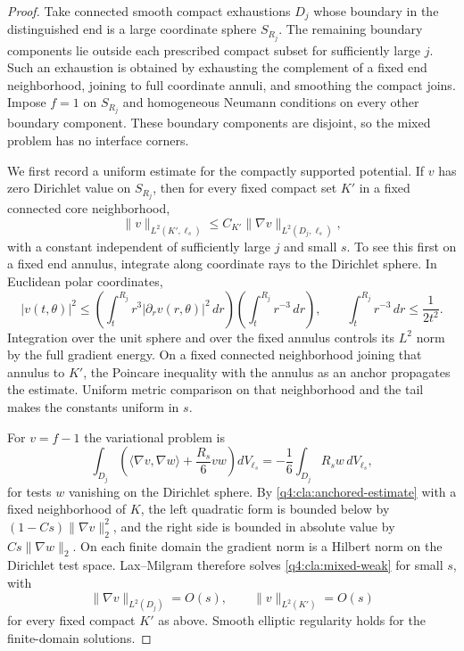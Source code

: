 \begin{proof}
Take connected smooth compact exhaustions $D_j$ whose boundary in
the distinguished end is a large coordinate sphere $S_{R_j}$.
The remaining boundary components lie outside each prescribed
compact subset for sufficiently large $j$.  Such an exhaustion is
obtained by exhausting the complement of a fixed end neighborhood,
joining to full coordinate annuli, and smoothing the compact joins.
Impose $f=1$ on $S_{R_j}$ and homogeneous Neumann conditions on every
other boundary component.  These boundary components are disjoint,
so the mixed problem has no interface corners.

We first record a uniform estimate for the compactly supported
potential.  If $v$ has zero Dirichlet value on $S_{R_j}$, then for
every fixed compact set $K'$ in a fixed connected core neighborhood,
\begin{equation}\label{q4:cla:anchored-estimate}
 \|v\|_{L^2(K',\ell_s)}
       \le C_{K'}\|\nabla v\|_{L^2(D_j,\ell_s)},
\end{equation}
with a constant independent of sufficiently large $j$ and small $s$.
To see this first on a fixed end annulus, integrate along coordinate
rays to the Dirichlet sphere.  In Euclidean polar coordinates,
\[
 |v(t,\theta)|^2
 \le\left(\int_t^{R_j}r^3|\partial_rv(r,\theta)|^2\,dr\right)
      \left(\int_t^{R_j}r^{-3}\,dr\right),
 \qquad \int_t^{R_j}r^{-3}\,dr\le\frac1{2t^2}.
\]
Integration over the unit sphere and over the fixed annulus controls
its $L^2$ norm by the full gradient energy.  On a fixed connected
neighborhood joining that annulus to $K'$, the Poincare inequality
with the annulus as an anchor propagates the estimate.  Uniform
metric comparison on that neighborhood and the tail makes the
constants uniform in $s$.

For $v=f-1$ the variational problem is
\begin{equation}\label{q4:cla:mixed-weak}
 \int_{D_j}\left(\langle\nabla v,\nabla w\rangle
                   +\frac{R_s}{6}vw\right)dV_{\ell_s}
       =-\frac16\int_{D_j}R_sw\,dV_{\ell_s},
\end{equation}
for tests $w$ vanishing on the Dirichlet sphere.  By
\eqref{q4:cla:anchored-estimate} with a fixed neighborhood of $K$,
the left quadratic form is bounded below by
$(1-Cs)\|\nabla v\|_2^2$, and the right side is bounded in absolute
value by $Cs\|\nabla w\|_2$.  On each finite domain the gradient norm
is a Hilbert norm on the Dirichlet test space.  Lax--Milgram therefore
solves \eqref{q4:cla:mixed-weak} for small $s$, with
\begin{equation}\label{q4:cla:mixed-energy}
 \|\nabla v\|_{L^2(D_j)}=O(s),\qquad
 \|v\|_{L^2(K')}=O(s)
\end{equation}
for every fixed compact $K'$ as above.  Smooth elliptic regularity
holds for the finite-domain solutions.


\end{proof}
